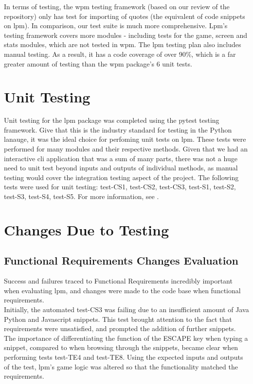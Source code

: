 \documentclass[12pt, titlepage]{article}
\begin{document}
In terms of testing, the wpm testing framework (based on our review of the repository) only has test for importing of quotes (the equivalent of code snippets on lpm). In comparison, our test suite is much more comprehensive. Lpm's testing framework covers more modules - including tests for the game, screen and stats modules, which are not tested in wpm. The lpm testing plan also includes manual testing. As a result, it has a code coverage of over 90\%, which is a far greater amount of testing than the wpm package's 6 unit tests.

\section{Unit Testing}
Unit testing for the lpm package was completed using the pytest testing framework. Give that this is the industry standard for testing in the Python lanauge, it was the ideal choice for perfoming unit tests on lpm. These tests were performed for many modules and their respective methods. Given that we had an interactive cli application that was a sum of many parts, there was not a huge need to unit test beyond inputs and outputs of individual methods, as manual testing would cover the integration testing aspect of the project. The following tests were used for unit testing: test-CS1, test-CS2, test-CS3, test-S1, test-S2, test-S3, test-S4, test-S5. For more information, see .

\section{Changes Due to Testing}

\subsection{Functional Requirements Changes Evaluation}
Success and failures traced to Functional Requirements incredibly important when evaluating lpm, and changes were made to the code base when functional requirements. \\

Initially, the automated test-CS3 was failing due to an insufficient amount of Java Python and Javascript snippets. This test brought attention to the fact that requirements were unsatisfied, and prompted the addition of further snippets. \\

The importance of differentiating the function of the ESCAPE key when typing a snippet, compared to when browsing through the snippets, became clear when performing tests test-TE4 and test-TE8. Using the expected inputs and outputs of the test, lpm's game logic was altered so that the functionality matched the requirements. \\
\end{document}

